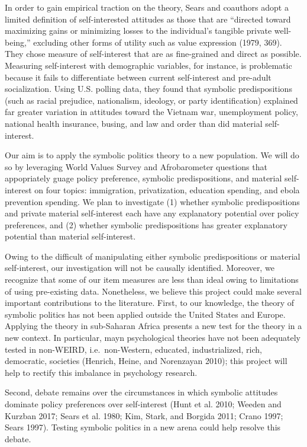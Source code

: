 \documentclass[]{article}
\begin{document}
In order to gain empirical traction on the theory, Sears and coauthors
adopt a limited definition of self-interested attitudes as those that
are ``directed toward maximizing gains or minimizing losses to the
individual's tangible private well-being,'' excluding other forms of
utility such as value expression (1979, 369). They chose measure of
self-interest that are as fine-grained and direct as possible. Measuring
self-interest with demographic variables, for instance, is problematic
because it fails to differentiate between current self-interest and
pre-adult socialization. Using U.S. polling data, they found that
symbolic predispositions (such as racial prejudice, nationalism,
ideology, or party identification) explained far greater variation in
attitudes toward the Vietnam war, unemployment policy, national health
insurance, busing, and law and order than did material self-interest.

Our aim is to apply the symbolic politics theory to a new population. We
will do so by leveraging World Values Survey and Afrobarometer questions
that appopriately guage policy preference, symbolic predispositions, and
material self-interest on four topics: immigration, privatization,
education spending, and ebola prevention spending. We plan to
investigate (1) whether symbolic predispositions and private material
self-interest each have any explanatory potential over policy
preferences, and (2) whether symbolic predispositions has greater
explanatory potential than material self-interest.

Owing to the difficult of manipulating either symbolic predispositions
or material self-interest, our investigation will not be causally
identified. Moreover, we recognize that some of our item measures are
less than ideal owing to limitations of using pre-existing data.
Nonetheless, we believe this project could make several important
contributions to the literature. First, to our knowledge, the theory of
symbolic politics has not been applied outside the United States and
Europe. Applying the theory in sub-Saharan Africa presents a new test
for the theory in a new context. In particular, mayn psychological
theories have not been adequately tested in non-WEIRD, i.e.~non-Western,
educated, industrialized, rich, democratic, societies (Henrich, Heine,
and Norenzayan 2010); this project will help to rectify this imbalance
in psychology research.

Second, debate remains over the circumstances in which symbolic
attitudes dominate policy preferences over self-interest (Hunt et al.
2010; Weeden and Kurzban 2017; Sears et al. 1980; Kim, Stark, and
Borgida 2011; Crano 1997; Sears 1997). Testing symbolic politics in a
new arena could help resolve this debate.
\end{document}
